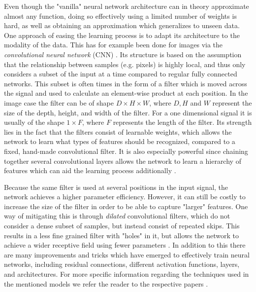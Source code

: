 \documentclass{report}
\begin{document}
Even though the "vanilla" neural network architecture can in theory approximate almost any function, doing so effectively using a limited number of weights is hard, as well as obtaining an approximation which generalizes to unseen data. One approach of easing the learning process is to adapt its architecture to the modality of the data. This has for example been done for images via the \textit{convolutional neural network} (CNN) \cite{lecun1989backpropagation}. Its structure is based on the assumption that the relationship between samples (e.g. pixels) is highly local, and thus only considers a subset of the input at a time compared to regular fully connected networks. This subset is often times in the form of a filter which is moved across the signal and used to calculate an element-wise product at each position. In the image case the filter can be of shape $D \times H \times W$, where $D, H$ and $W$ represent the size of the depth, height, and width of the filter. For a one dimensional signal it is usually of the shape $1 \times F$, where $F$ represents the length of the filter. Its strength lies in the fact that the filters consist of learnable weights, which allows the network to learn what types of features should be recognized, compared to a fixed, hand-made convolutional filter. It is also especially powerful since chaining together several convolutional layers allows the network to learn a hierarchy of features which can aid the learning process additionally \cite{goodfellow2016deep}.

Because the same filter is used at several positions in the input signal, the network achieves a higher parameter efficiency. However, it can still be costly to increase the size of the filter in order to be able to capture "larger" features. One way of mitigating this is through \textit{dilated} convolutional filters, which do not consider a dense subset of samples, but instead consist of repeated skips. This results in a less fine grained filter with "holes" in it, but allows the network to achieve a wider receptive field using fewer parameters \cite{yu2015multi, oord2016wavenet}. In addition to this there are many improvements and tricks which have emerged to effectively train neural networks, including residual connections, different activation functions, layers, and architectures. For more specific information regarding the techniques used in the mentioned models we refer the reader to the respective papers \cite{kong2020diffwave, lee2021priorgrad, oord2016wavenet, tan2021survey}.
\end{document}
